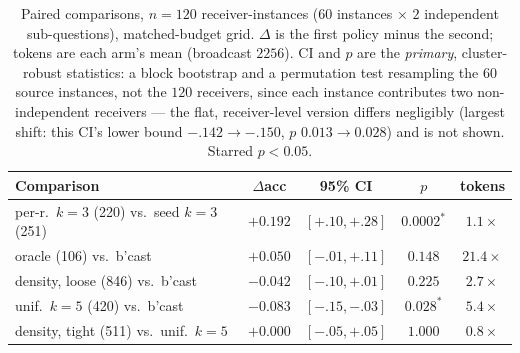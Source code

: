 \documentclass[sigconf,anonymous]{aamas}
\theoremstyle{remark}
\begin{document}
\begin{table}[t]
\centering
\caption{Paired comparisons, $n=120$ receiver-instances ($60$
instances $\times$ $2$ independent sub-questions), matched-budget
grid. $\Delta$ is the first policy minus the second; tokens are each
arm's mean (broadcast $2256$). CI and $p$ are the \emph{primary},
cluster-robust statistics: a block bootstrap and a permutation test
resampling the $60$ source instances, not the $120$ receivers, since
each instance contributes two non-independent receivers --- the flat,
receiver-level version differs negligibly (largest shift: this CI's
lower bound $-.142\to-.150$, $p$ $0.013\to0.028$) and is not shown.
Starred $p<0.05$.}
\label{tab:main}
\footnotesize
\setlength{\tabcolsep}{3pt}
\begin{tabular}{lcccc}
\toprule
Comparison & $\Delta$acc & 95\% CI & $p$ & tokens \\
\midrule
per-r.\ $k{=}3$ (220) vs.\ seed $k{=}3$ (251) & $+0.192$ & $[+.10,+.28]$ & $0.0002^{*}$ & $1.1\times$ \\
oracle (106) vs.\ b'cast & $+0.050$ & $[-.01,+.11]$ & $0.148$      & $21.4\times$ \\
density, loose (846) vs.\ b'cast & $-0.042$ & $[-.10,+.01]$ & $0.225$   & $2.7\times$ \\
unif.\ $k{=}5$ (420) vs.\ b'cast & $-0.083$ & $[-.15,-.03]$ & $0.028^{*}$ & $5.4\times$ \\
density, tight (511) vs.\ unif.\ $k{=}5$ & $+0.000$ & $[-.05,+.05]$ & $1.000$  & $0.8\times$ \\
\bottomrule
\end{tabular}
\end{table}
\end{document}
